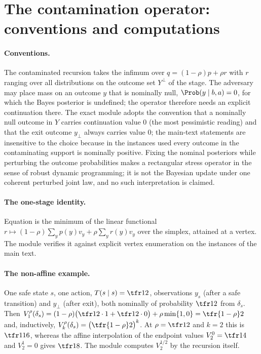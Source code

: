 \section{The contamination operator: conventions and computations}\label{si:contam}

\paragraph{Conventions.} The contaminated recursion  takes the infimum over $q=(1-\rho)p+\rho r$ with $r$ ranging over all distributions on the outcome set $Y^{\bot}$ of the stage. The adversary may place mass on an outcome $y$ that is nominally null, $\Prob(y\mid b,a)=0$, for which the Bayes posterior is undefined; the operator therefore needs an explicit continuation there. The exact module adopts the convention that a nominally null outcome in $Y$ carries continuation value $0$ (the most pessimistic reading) and that the exit outcome $y_\bot$ always carries value $0$; the main-text statements are insensitive to the choice because in the instances used every outcome in the contaminating support is nominally positive. Fixing the nominal posteriors while perturbing the outcome probabilities makes  a rectangular stress operator in the sense of robust dynamic programming; it is not the Bayesian update under one coherent perturbed joint law, and no such interpretation is claimed.

\paragraph{The one-stage identity.} Equation  is the minimum of the linear functional $r\mapsto(1-\rho)\sum_yp(y)v_y+\rho\sum_yr(y)v_y$ over the simplex, attained at a vertex. The module verifies it against explicit vertex enumeration on the instances of the main text.

\paragraph{The non-affine example.} One safe state $s$, one action, $T(s\mid s)=\tfr12$, observations $y_s$ (after a safe transition) and $y_\bot$ (after exit), both nominally of probability $\tfr12$ from $\delta_s$. Then $V^\rho_1(\delta_s)=(1-\rho)\bigl(\tfr12\cdot1+\tfr12\cdot0\bigr)+\rho\min\{1,0\}=\tfr{1-\rho}2$ and, inductively, $V^\rho_{k}(\delta_s)=\bigl(\tfr{1-\rho}2\bigr)^{k}$. At $\rho=\tfr12$ and $k=2$ this is $\tfr1{16}$, whereas the affine interpolation of the endpoint values $V^0_2=\tfr14$ and $V^1_2=0$ gives $\tfr18$. The module computes $V^{1/2}_2$ by the recursion itself.

